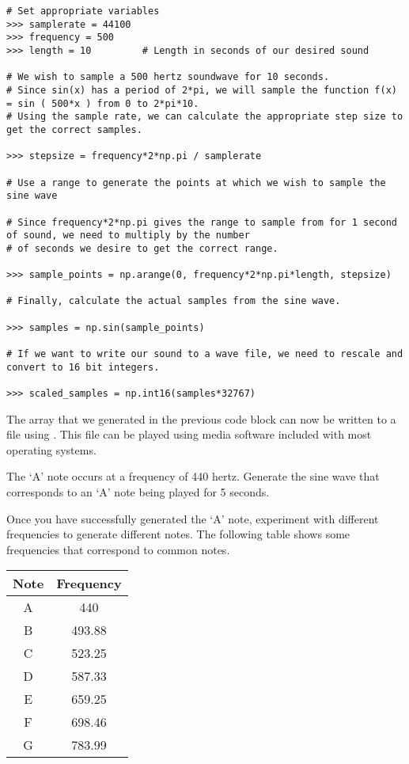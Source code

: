 \begin{lstlisting}
# Set appropriate variables
>>> samplerate = 44100
>>> frequency = 500
>>> length = 10			# Length in seconds of our desired sound

# We wish to sample a 500 hertz soundwave for 10 seconds.
# Since sin(x) has a period of 2*pi, we will sample the function f(x) = sin ( 500*x ) from 0 to 2*pi*10.
# Using the sample rate, we can calculate the appropriate step size to get the correct samples.

>>> stepsize = frequency*2*np.pi / samplerate

# Use a range to generate the points at which we wish to sample the sine wave

# Since frequency*2*np.pi gives the range to sample from for 1 second of sound, we need to multiply by the number
# of seconds we desire to get the correct range.

>>> sample_points = np.arange(0, frequency*2*np.pi*length, stepsize)

# Finally, calculate the actual samples from the sine wave.

>>> samples = np.sin(sample_points)

# If we want to write our sound to a wave file, we need to rescale and convert to 16 bit integers.

>>> scaled_samples = np.int16(samples*32767)
\end{lstlisting}

The  array that we generated in the previous code block can now be written to a file using .
This file can be played using media software included with most operating systems.

\begin{problem}

The `A' note occurs at a frequency of 440 hertz.
Generate the sine wave that corresponds to an `A' note being played for 5 seconds.

Once you have successfully generated the `A' note, experiment with different frequencies to generate different notes.
The following table shows some frequencies that correspond to common notes.

\begin{center}
\begin{tabular}{|c|c|}
\hline
Note & Frequency \\
\hline
A & 440 \\
B & 493.88 \\
C & 523.25 \\
D & 587.33 \\
E & 659.25 \\
F & 698.46 \\
G & 783.99 \\
\hline
\end{tabular}
\end{center}

\end{problem}


